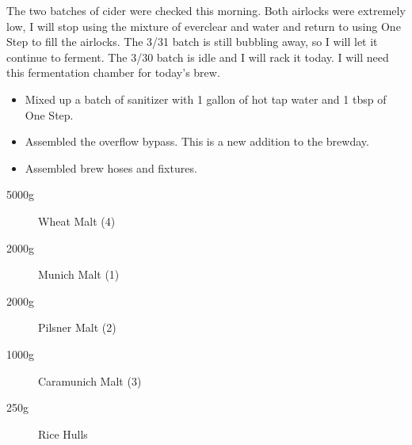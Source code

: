 The two batches of cider were checked this morning.  Both airlocks were extremely low, I will stop using the mixture of everclear and water and return to using One Step to fill the airlocks.  The 3/31 batch is still bubbling away, so I will let it continue to ferment.  The 3/30 batch is idle and I will rack it today.  I will need this fermentation chamber for today's brew.

\begin{itemize}
    \item Mixed up a batch of sanitizer with 1 gallon of hot tap water and 1 tbsp of One Step.
    \item Assembled the overflow bypass.  This is a new addition to the brewday.
    \item Assembled brew hoses and fixtures. 
\end{itemize}

\begin{description}
    \item[5000g] Wheat Malt (4)
    \item[2000g] Munich Malt (1)
    \item[2000g] Pilsner Malt (2)
    \item[1000g] Caramunich Malt (3)
    \item[250g] Rice Hulls
\end{description}

